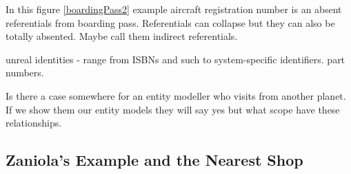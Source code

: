 \begin{noteforfuture}
In this figure \ref{boardingPass2} example aircraft registration number is an absent referentials from
boarding pass. Referentials can collapse but they can also be totally absented. Maybe call them indirect referentials. 
\end{noteforfuture}



\begin{noteforfuture}
unreal identities - range from ISBNs and such to system-specific identifiers. part numbers.
\end{noteforfuture}
\begin{noteforfuture}
Is there a case somewhere for an entity modeller who visits from another planet.
If we show them our entity models they will say yes but what scope have these relationships.
\end{noteforfuture}

\subsection{Zaniola's Example and the Nearest Shop}



 
